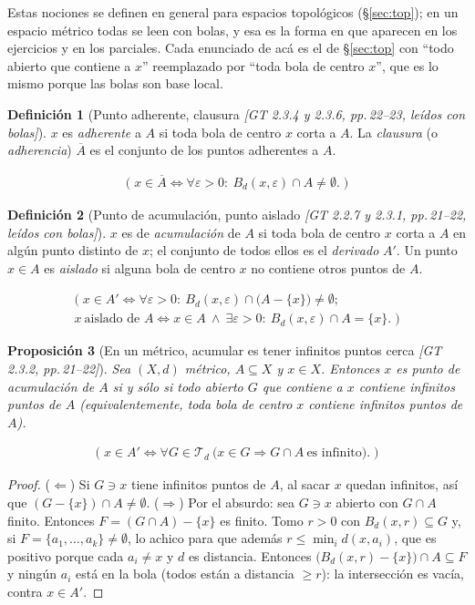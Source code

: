 \documentclass[11pt,a4paper]{article}
\newcommand{\lgc}[1]{\par\vspace{-3pt}\begin{gather*}\big(\;#1\;\big)\end{gather*}\vspace{-6pt}}
\theoremstyle{definition}
\newtheorem{definicion}{Definición}[section]
\theoremstyle{plain}
\newtheorem{proposicion}[definicion]{Proposición}
\newcommand{\fnt}[1]{{\normalfont\small\itshape\color{gray!150!black}[#1]}}
\newcommand{\cl}[1]{\overline{#1}}
\newcommand{\Bola}[2]{B_d(#1,#2)}
\newcommand{\tp}{\mathcal{T}}
\begin{document}
\noindent Estas nociones se definen en general para espacios topológicos (\S\ref{sec:top}); en un espacio métrico todas se leen con bolas, y esa es la forma en que aparecen en los ejercicios y en los parciales. Cada enunciado de acá es el de \S\ref{sec:top} con ``todo abierto que contiene a $x$'' reemplazado por ``toda bola de centro $x$'', que es lo mismo porque las bolas son base local.

\begin{definicion}[Punto adherente, clausura \fnt{GT 2.3.4 y 2.3.6, pp.\,22--23, leídos con bolas}]
$x$ es \emph{adherente} a $A$ si toda bola de centro $x$ corta a $A$. La \emph{clausura} (o \emph{adherencia}) $\cl A$ es el conjunto de los puntos adherentes a $A$.
\lgc{x\in\cl A\iff \forall\varepsilon>0:\ \Bola{x}{\varepsilon}\cap A\ne\emptyset.}
\end{definicion}

\begin{definicion}[Punto de acumulación, punto aislado \fnt{GT 2.2.7 y 2.3.1, pp.\,21--22, leídos con bolas}]
$x$ es de \emph{acumulación} de $A$ si toda bola de centro $x$ corta a $A$ en algún punto distinto de $x$; el conjunto de todos ellos es el \emph{derivado} $A'$. Un punto $x\in A$ es \emph{aislado} si alguna bola de centro $x$ no contiene otros puntos de $A$.
\lgc{x\in A'\iff \forall\varepsilon>0:\ \Bola{x}{\varepsilon}\cap\big(A-\{x\}\big)\ne\emptyset;\\
x\ \text{aislado de } A\iff x\in A\ \wedge\ \exists\varepsilon>0:\ \Bola{x}{\varepsilon}\cap A=\{x\}.}
\end{definicion}

\begin{proposicion}[En un métrico, acumular es tener infinitos puntos cerca \fnt{GT 2.3.2, pp.\,21--22}]\label{hu:acuminf}
Sea $(X,d)$ métrico, $A\subseteq X$ y $x\in X$. Entonces $x$ es punto de acumulación de $A$ si y sólo si todo abierto $G$ que contiene a $x$ contiene infinitos puntos de $A$ (equivalentemente, toda bola de centro $x$ contiene infinitos puntos de $A$).
\lgc{x\in A'\iff \forall G\in\tp_d\ \big(x\in G\Rightarrow G\cap A\ \text{es infinito}\big).}
\end{proposicion}

\begin{proof}
($\Leftarrow$) Si $G\ni x$ tiene infinitos puntos de $A$, al sacar $x$ quedan infinitos, así que $(G-\{x\})\cap A\ne\emptyset$.
($\Rightarrow$) Por el absurdo: sea $G\ni x$ abierto con $G\cap A$ finito. Entonces $F=(G\cap A)-\{x\}$ es finito. Tomo $r>0$ con $\Bola{x}{r}\subseteq G$ y, si $F=\{a_1,\dots,a_k\}\ne\emptyset$, lo achico para que además $r\le\min_i d(x,a_i)$, que es positivo porque cada $a_i\ne x$ y $d$ es distancia. Entonces $\big(\Bola{x}{r}-\{x\}\big)\cap A\subseteq F$ y ningún $a_i$ está en la bola (todos están a distancia $\ge r$): la intersección es vacía, contra $x\in A'$.
\end{proof}
\end{document}
